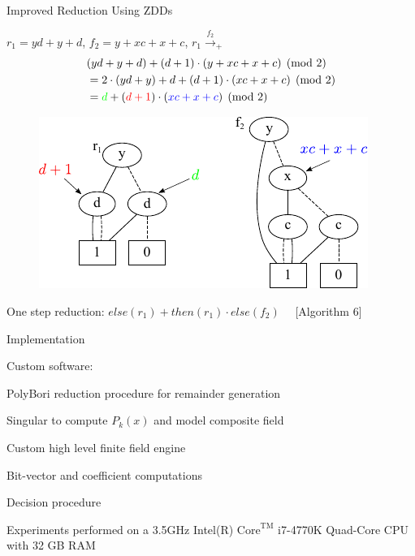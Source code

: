 \begin{frame}{\large{Improved Reduction Using ZDDs}}
\bi
  \item $r_1=yd + y + d$, $f_2=y + xc + x + c$, $r_1 \xrightarrow{f_2}_+$
        {\small
        \begin{align*}
          & (yd + y + d) + (d + 1)\cdot(y + xc + x + c) \pmod{2}\\
          &= 2\cdot(yd + y) + d + (d+1)\cdot(xc + x + c) \pmod{2}\\
          &= \textcolor{green}{d} + (\textcolor{red}{d+1})\cdot(\textcolor{blue}{xc + x + c})  \pmod{2}
        \end{align*}
        }
\ei
\begin{figure}[hbt]
\centering
\includegraphics[scale=0.9]{r1_f2_2.pdf}
\label{f2}
\end{figure}
\bi
  \item One step reduction: $else(r_1) + then(r_1)\cdot else(f_2)$ ~~[Algorithm 6]
\ei
\end{frame}

\begin{frame}{\large Implementation}
\bi
	\item Custom software: 
	\bi
		\pause
		\vspace{0.1in}
		\item PolyBori reduction procedure for remainder generation
		\vspace{0.1in}
		\pause
		\item Singular to compute $P_k(x)$ and model composite field
		\vspace{0.1in}
		\pause
		\item Custom high level finite field engine 
		\pause
		\bi
		\item Bit-vector and coefficient computations
		\item Decision procedure
		\ei
	\ei
	\pause
	\item Experiments performed on a 3.5GHz 
	Intel(R) $\text{Core}^{\text{TM}}$ i7-4770K Quad-Core CPU with 32 GB RAM
\ei
\end{frame}

